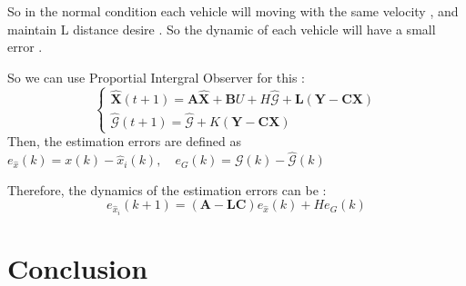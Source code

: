 \documentclass[letterpaper, 10pt, conference]{ieeeconf}  %
\begin{document}
So in the normal condition each vehicle will moving with the same velocity , and maintain L distance desire . So the dynamic of each vehicle will have a small error . 

So we can use Proportial Intergral Observer for this : 
\begin{equation}\label{obser_global}
    \left\{ \begin{array}{l}
        \mathbf{\hat{X}}(t+1)=\mathbf{A} \mathbf{\hat{X}} + \mathbf{B} U + H\mathcal{\hat{G}} + \mathbf{L}(\mathbf{Y} - \mathbf{C}\mathbf{X} )
        \\ 
         \mathcal{\hat{G}}(t+1) =\mathcal{\hat{G}} +  K(\mathbf{Y} - \mathbf{C}\mathbf{X})
     \end{array}\right.
\end{equation}
 Then, the estimation errors are defined as
 $e_{\hat{x}} (k) = x(k) - \hat{x}_i (k), \quad e_G (k) = \mathcal{G}(k) - \hat{\mathcal{G}} (k) $
 
 Therefore, the dynamics of the estimation errors can be : 
\begin{equation}
    e_{\hat{x}_i} (k + 1) = (\mathbf{A} -\mathbf{LC}) e_{\hat{x}} (k) + He_G (k)
\end{equation}


\section{Conclusion}






% 
\end{document}

